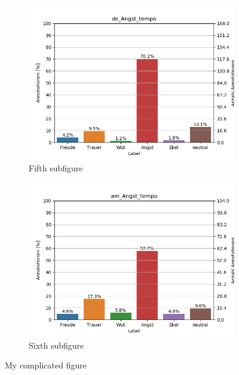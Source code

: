 \documentclass[11pt,a4paper,headsepline,twoside,toc=bibliography]{scrreprt}
\begin{document}
\begin{figure}[t!]
	\medskip
	\begin{subfigure}{0.48\textwidth}
		\includegraphics[width=\linewidth]{plots/de_Angst_tempo.png}
		\caption{Fifth subfigure} \label{fig:de_A_tempo}
	\end{subfigure}\hspace*{\fill}
	\begin{subfigure}{0.48\textwidth}
		\includegraphics[width=\linewidth]{plots/am_Angst_tempo.png}
		\caption{Sixth subfigure} \label{fig:am_A_tempo}
	\end{subfigure}
	
	\caption{My complicated figure} \label{fig:countplots_A}
\end{figure}
\end{document}
